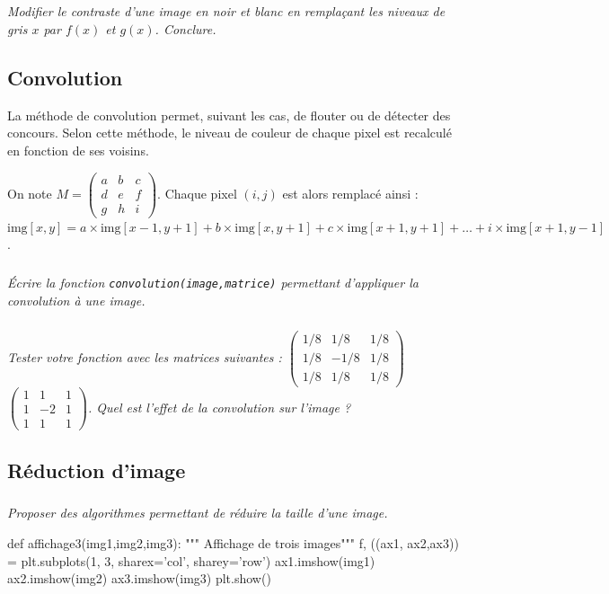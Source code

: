 \documentclass[10pt,fleqn]{article} %
\begin{document}
\begin{multicols}{2}
\subparagraph{}\textit{Modifier le contraste d'une image en noir et blanc en remplaçant les niveaux de gris $x$ par $f(x)$ et $g(x)$. Conclure.}

\subsection*{Convolution}
La méthode de convolution permet, suivant les cas, de flouter ou de détecter des concours. 
Selon cette méthode, le niveau de couleur de chaque pixel est recalculé en fonction de ses voisins. 


On note $M=\begin{pmatrix} a & b & c \\ d & e & f \\ g & h & i \end{pmatrix}$. Chaque pixel $(i,j)$ est alors remplacé ainsi : $\text{img}[x, y] = a \times \text{img}[x-1, y+1] + b \times \text{img}[x, y+1]+ c \times \text{img}[x+1, y+1] + \ldots + i \times \text{img}[x+1, y-1]$.

\subparagraph{}\textit{Écrire la fonction \texttt{convolution(image,matrice)} permettant d'appliquer la convolution à une image.}


\subparagraph{}\textit{Tester votre fonction avec les matrices suivantes : 
$\begin{pmatrix} 1/8 & 1/8 & 1/8 \\ 1/8 & -1/8 & 1/8 \\ 1/8 & 1/8 & 1/8 \end{pmatrix}$ 
$\begin{pmatrix} 1 & 1 & 1 \\ 1 & -2 & 1 \\ 1 & 1 & 1 \end{pmatrix}$. Quel est l'effet de la convolution sur l'image ?}


\subsection*{Réduction d'image}
\subparagraph{}\textit{Proposer des algorithmes permettant de réduire la taille d'une image.}
\ifprof
\else
\end{multicols}
\fi


\begin{py}
\begin{python}
def affichage3(img1,img2,img3):
    """ Affichage de trois images"""
    f, ((ax1, ax2,ax3)) = plt.subplots(1, 3, sharex='col', sharey='row')
    ax1.imshow(img1)
    ax2.imshow(img2)    
    ax3.imshow(img3)
    plt.show()
\end{python}
\end{py}
\end{document}
